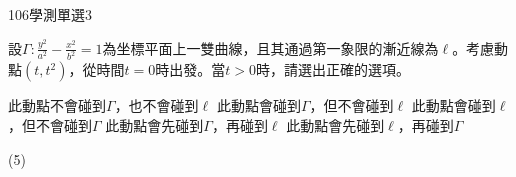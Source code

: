     \begin{QUESTION}
        \begin{ExamInfo}{106}{學測}{單選}{3}
        \end{ExamInfo}
        \begin{ExamAnsRateInfo}{38}{71}{34}{9}
        \end{ExamAnsRateInfo}
        \begin{QBODY}
            設$\Gamma :\frac{{{y}^{2}}}{{{a}^{2}}}-\frac{{{x}^{2}}}{{{b}^{2}}}=1$為坐標平面上一雙曲線，且其通過第一象限的漸近線為$\ell $。考慮動點$(t,{{t}^{2}})$，從時間$t=0$時出發。當$t>0$時，請選出正確的選項。
			\begin{QOPS}
			\QOP 此動點不會碰到$\Gamma $，也不會碰到$\ell $
			\QOP 此動點會碰到$\Gamma $，但不會碰到$\ell $
			\QOP 此動點會碰到$\ell $，但不會碰到$\Gamma $
			\QOP 此動點會先碰到$\Gamma $，再碰到$\ell $
			\QOP 此動點會先碰到$\ell $，再碰到$\Gamma $
			\end{QOPS}
        \end{QBODY}
        \begin{QFROMS}
        \end{QFROMS}
        \begin{QTAGS}\end{QTAGS}
        \begin{QANS}
            (5)
        \end{QANS}
        \begin{QSOLLIST}
        \end{QSOLLIST}
        \begin{QEMPTYSPACE}
        \end{QEMPTYSPACE}
    \end{QUESTION}
